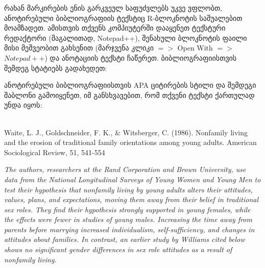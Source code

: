 \documentclass{article}\usepackage[]{graphicx}\usepackage[]{color}
\begin{document}
რახან მარკირების ენის გარკვეულ საფუძვლებს უკვე ვფლობთ, ანოტირებული ბიბლიოგრაფიის ტექსტიც R-ბლოკნოტის საშუალებით მოამზადეთ. ამისთვის თქვენს კომპიუტერში დააყენეთ ტექსტური რედაქტორი (მაგალითად, Notepad++), შენახული ბლოკნოტის ფაილი მისი მეშვეობით გახსენით (მარჯვენა კლიკი $=>$ Open With $=>$ $Notepad++$) და ანოტაციის ტექსტი ჩაწერეთ. ბიბლიოგრაფიისთვის შემდეგ სტატიებს გადახედეთ:




ანოტირებული ბიბლიოგრაფიისთვის APA ციტირების სტილი და შემდეგი შაბლონი გამოიყენეთ, იმ განსხვავებით, რომ თქვენი ტექსტი ქართულად უნდა იყოს:

\\

Waite, L. J., Goldschneider, F. K., & Witsberger, C. (1986). Nonfamily living and the erosion of traditional family orientations among young adults. American Sociological Review, 51, 541-554

\emph{The authors, researchers at the Rand Corporation and Brown University, use data from the National Longitudinal Surveys of Young Women and Young Men to test their hypothesis that nonfamily living by young adults alters their attitudes, values, plans, and expectations, moving them away from their belief in traditional sex roles. They find their hypothesis strongly supported in young females, while the effects were fewer in studies of young males. Increasing the time away from parents before marrying increased individualism, self-sufficiency, and changes in attitudes about families. In contrast, an earlier study by Williams cited below shows no significant gender differences in sex role attitudes as a result of nonfamily living.}
\end{document}
